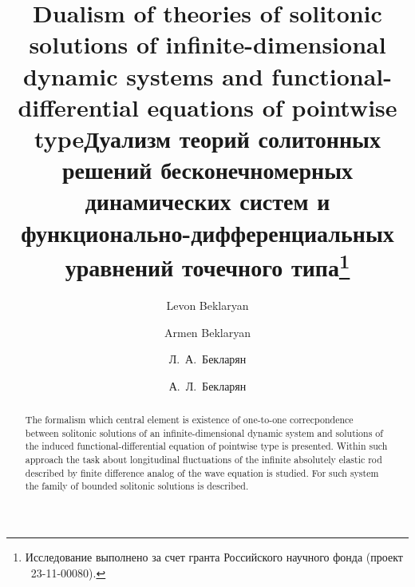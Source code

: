 \begin{englishtitle} %
\title{Dualism of theories of solitonic solutions of infinite-dimensional dynamic systems and functional- differential equations of pointwise type}
\author{Levon Beklaryan \and  Armen Beklaryan
}

\maketitle

\begin{abstract}
The formalism which central element is existence of one-to-one correcpondence  between solitonic solutions of an infinite-dimensional dynamic system and solutions of the induced functional-differential equation of pointwise type is presented. Within such approach the task about longitudinal fluctuations of the infinite absolutely elastic rod described  by finite  difference analog of the wave equation is studied. For such system the family of bounded solitonic solutions is described.

\end{abstract}
\end{englishtitle}


\title{Дуализм теорий  солитонных решений бесконечномерных динамических систем и функционально-дифференциальных уравнений точечного типа\thanks{Исследование выполнено за счет гранта Российского научного фонда (проект \textnumero~23-11-00080).}}
\author{Л.~А.~Бекларян \and А.~Л.~Бекларян
}


